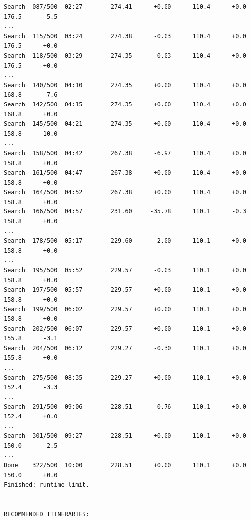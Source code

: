 \begin{tcolorbox}[
  breakable,
  enhanced,
  colback=termbg,
  colframe=termborder,
  colupper=termfg,
  before upper=\singlespacing,
  arc=5pt,
  boxrule=0.8pt,
  left=6pt, right=6pt, top=1pt, bottom=6pt
]
\begin{lstlisting}[style=terminalstyle]
Search  087/500  02:27        274.41      +0.00      110.4      +0.0        176.5      -5.5
...
Search  115/500  03:24        274.38      -0.03      110.4      +0.0        176.5      +0.0
Search  118/500  03:29        274.35      -0.03      110.4      +0.0        176.5      +0.0
...
Search  140/500  04:10        274.35      +0.00      110.4      +0.0        168.8      -7.6
Search  142/500  04:15        274.35      +0.00      110.4      +0.0        168.8      +0.0
Search  145/500  04:21        274.35      +0.00      110.4      +0.0        158.8     -10.0
...
Search  158/500  04:42        267.38      -6.97      110.4      +0.0        158.8      +0.0
Search  161/500  04:47        267.38      +0.00      110.4      +0.0        158.8      +0.0
Search  164/500  04:52        267.38      +0.00      110.4      +0.0        158.8      +0.0
Search  166/500  04:57        231.60     -35.78      110.1      -0.3        158.8      +0.0
...
Search  178/500  05:17        229.60      -2.00      110.1      +0.0        158.8      +0.0
...
Search  195/500  05:52        229.57      -0.03      110.1      +0.0        158.8      +0.0
Search  197/500  05:57        229.57      +0.00      110.1      +0.0        158.8      +0.0
Search  199/500  06:02        229.57      +0.00      110.1      +0.0        158.8      +0.0
Search  202/500  06:07        229.57      +0.00      110.1      +0.0        155.8      -3.1
Search  204/500  06:12        229.27      -0.30      110.1      +0.0        155.8      +0.0
...
Search  275/500  08:35        229.27      +0.00      110.1      +0.0        152.4      -3.3
...
Search  291/500  09:06        228.51      -0.76      110.1      +0.0        152.4      +0.0
...
Search  301/500  09:27        228.51      +0.00      110.1      +0.0        150.0      -2.5
...
Done    322/500  10:00        228.51      +0.00      110.1      +0.0        150.0      +0.0
Finished: runtime limit.


RECOMMENDED ITINERARIES:




\end{lstlisting}
\end{tcolorbox}
